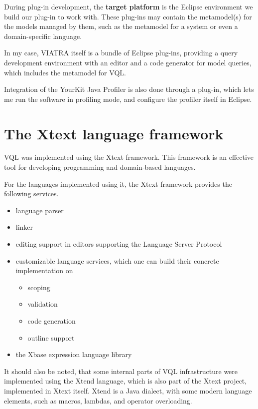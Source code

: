 \documentclass[11pt,a4paper,oneside]{report}
\begin{document}
During plug-in development, the \textbf{target platform} is the Eclipse
environment we build our plug-in to work with. These plug-ins may contain
the metamodel(s) for the models managed by them, such as the metamodel for a
system or even a domain-specific language.

In my case, VIATRA itself is a bundle of Eclipse plug-ins, providing a query
development environment with an editor and a code generator for model
queries, which includes the metamodel for VQL\cite{viatra}.

Integration of the YourKit Java Profiler is also done through a plug-in, which
lets me run the software in profiling mode, and configure the profiler itself
in Eclipse.

\section{The Xtext language framework}
VQL was implemented using the Xtext framework. This framework is an effective
tool for developing programming and domain-based languages.

For the languages implemented using it, the Xtext framework provides the
following services\cite{xtext}.

\begin{itemize}
    \item{language parser}
    \item{linker}
    \item{editing support in editors supporting the Language Server Protocol}
    \item{
        customizable language services, which one can build their concrete
        implementation on
        \begin{itemize}
            \item{scoping}
            \item{validation}
            \item{code generation}
            \item{outline support}
        \end{itemize}
    }
    \item{the Xbase expression language library}
\end{itemize}

It should also be noted, that some internal parts of VQL infrastructure were
implemented using the Xtend language, which is also part of the Xtext project,
implemented in Xtext itself. Xtend is a Java dialect, with some modern language
elements, such as macros, lambdas, and operator overloading\cite{xtend}.
\end{document}
